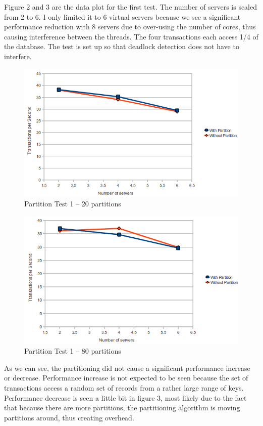 \documentclass[a4paper, 10pt, notitlepage]{article}
\begin{document}
Figure 2 and 3 are the data plot for the first test. The number of servers is scaled from 2 to 6. I only
limited it to 6 virtual servers because we see a significant performance reduction with 8 servers due to over-using the number
of cores, thus causing interference between the threads. The four transactions each access 1/4 of the database. The test is 
set up so that deadlock detection does not have to interfere. 

\begin{figure}[h!]

  \centering
    \includegraphics[scale=0.7]{peval1.png}
  \caption{Partition Test 1 -- 20 partitions}
\end{figure}

\begin{figure}[h!]

  \centering
    \includegraphics[scale=0.7]{peval2.png}
  \caption{Partition Test 1 -- 80 partitions}
\end{figure}

As we can see, the partitioning did not cause a significant performance increase or decrease. Performance increase is not expected to be seen because
the set of transactions access a random set of records from a rather large range of keys. Performance decrease is seen a little bit
in figure 3, most likely due to the fact that because there are more partitions, the partitioning algorithm is moving partitions
around, thus creating overhead.
\end{document}
